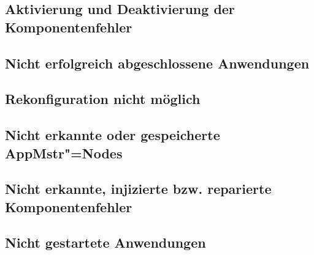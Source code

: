 \subsection{Aktivierung und Deaktivierung der Komponentenfehler}
\label{sec:faultInjectionEval}


\subsection{Nicht erfolgreich abgeschlossene Anwendungen}
\label{sec:failedAppsEval}





\subsection{Rekonfiguration nicht möglich}
\label{sec:noReconfig}






\subsection{Nicht erkannte oder gespeicherte \ac{AppMstr}"=Nodes}
\label{sec:noDetectedHost2}




\subsection{Nicht erkannte, injizierte bzw. reparierte Komponentenfehler}
\label{sec:noDetectedFault}


\subsection{Nicht gestartete Anwendungen}
\label{sec:notStartedApps}


